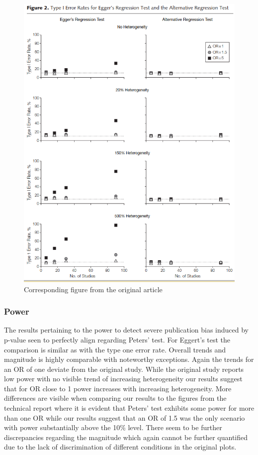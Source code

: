 \documentclass[
  english,
  doc,floatsintext,draftall]{apa6}
\begin{document}
\begin{figure}
\includegraphics[width=400pt]{../data/type_1_error} \caption{Corresponding figure from the original article}\label{fig:unnamed-chunk-6}
\end{figure}

\hypertarget{power}{%
\subsubsection{Power}\label{power}}

The results pertaining to the power to detect severe publication bias induced by p-value seen to perfectly align regarding Peters' test. For Eggert's test the comparison is similar as with the type one error rate. Overall trends and magnitude is highly comparable with noteworthy exceptions. Again the trends for an OR of one deviate from the original study.
While the original study reports low power with no visible trend of increasing heterogeneity our results suggest that for OR close to 1 power increases with increasing heterogeneity.
More differences are visible when comparing our results to the figures from the technical report where it is evident that Peters' test exhibits some power for more than one OR while our results suggest that an OR of 1.5 was the only scenario with power substantially above the 10\% level.
There seem to be further discrepancies regarding the magnitude which again cannot be further quantified due to the lack of discrimination of different conditions in the original plots.
\end{document}
